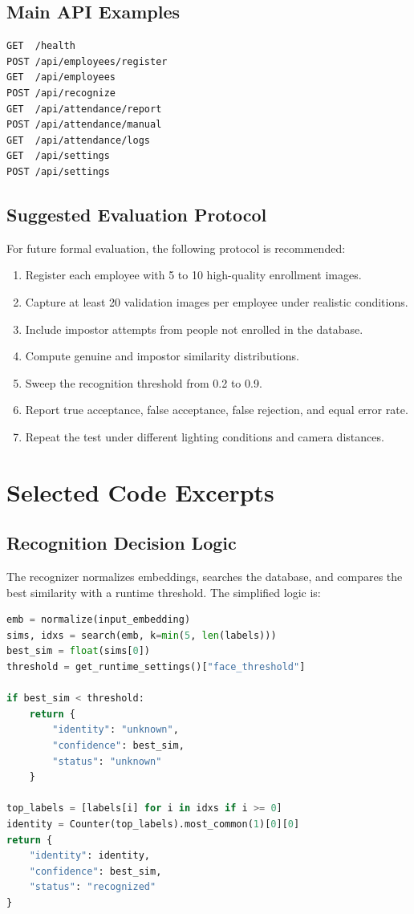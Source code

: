 \section{Main API Examples}

\begin{lstlisting}[style=pythonstyle]
GET  /health
POST /api/employees/register
GET  /api/employees
POST /api/recognize
GET  /api/attendance/report
POST /api/attendance/manual
GET  /api/attendance/logs
GET  /api/settings
POST /api/settings
\end{lstlisting}

\section{Suggested Evaluation Protocol}

For future formal evaluation, the following protocol is recommended:

\begin{enumerate}
  \item Register each employee with 5 to 10 high-quality enrollment images.
  \item Capture at least 20 validation images per employee under realistic conditions.
  \item Include impostor attempts from people not enrolled in the database.
  \item Compute genuine and impostor similarity distributions.
  \item Sweep the recognition threshold from 0.2 to 0.9.
  \item Report true acceptance, false acceptance, false rejection, and equal error rate.
  \item Repeat the test under different lighting conditions and camera distances.
\end{enumerate}

\chapter{Selected Code Excerpts}

\section{Recognition Decision Logic}

The recognizer normalizes embeddings, searches the database, and compares the best similarity with a runtime threshold. The simplified logic is:

\begin{lstlisting}[style=pythonstyle,language=Python]
emb = normalize(input_embedding)
sims, idxs = search(emb, k=min(5, len(labels)))
best_sim = float(sims[0])
threshold = get_runtime_settings()["face_threshold"]

if best_sim < threshold:
    return {
        "identity": "unknown",
        "confidence": best_sim,
        "status": "unknown"
    }

top_labels = [labels[i] for i in idxs if i >= 0]
identity = Counter(top_labels).most_common(1)[0][0]
return {
    "identity": identity,
    "confidence": best_sim,
    "status": "recognized"
}
\end{lstlisting}

